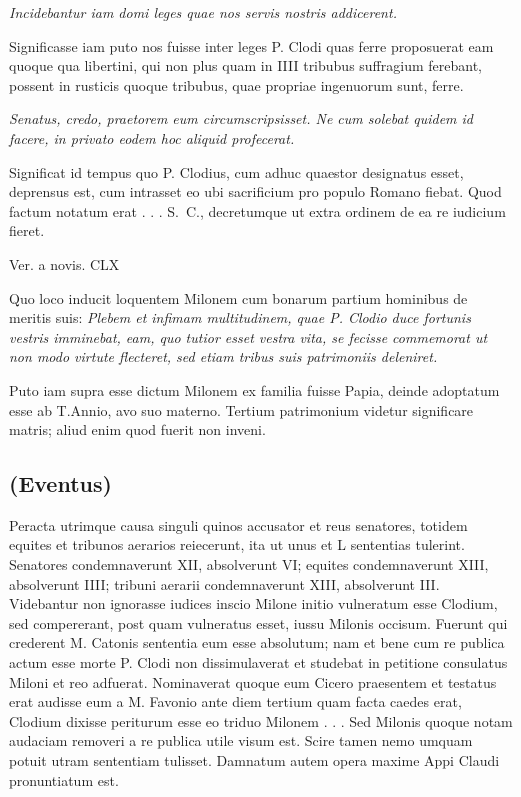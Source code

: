 \textit{Incidebantur iam domi leges quae nos servis nostris addicerent.}

Significasse iam puto nos fuisse inter leges P. Clodi quas ferre proposuerat eam quoque qua libertini, qui non plus quam in IIII tribubus suffragium ferebant, possent in rusticis quoque tribubus, quae propriae ingenuorum sunt, ferre.

\textit{Senatus, credo, praetorem eum circumscripsisset. Ne cum solebat quidem id facere, in privato eodem hoc aliquid profecerat.}

Significat id tempus quo P. Clodius, cum adhuc quaestor designatus esset, deprensus est, cum intrasset eo ubi sacrificium pro populo Romano fiebat. Quod factum notatum erat . . . S.~C., decretumque ut extra ordinem de ea re iudicium fieret.

Ver. a novis. CLX

Quo loco inducit loquentem Milonem cum bonarum partium hominibus de meritis suis: \textit{Plebem et infimam multitudinem, quae P. Clodio duce fortunis vestris imminebat, eam, quo tutior esset vestra vita, se fecisse commemorat ut non modo virtute flecteret, sed etiam tribus suis patrimoniis deleniret.}

Puto iam supra esse dictum Milonem ex familia fuisse Papia, deinde adoptatum esse ab T.Annio, avo suo materno. Tertium patrimonium videtur significare matris; aliud enim quod fuerit non inveni.

\subsection*{(Eventus)}

Peracta utrimque causa singuli quinos accusator et reus senatores, totidem equites et tribunos aerarios reiecerunt, ita ut unus et L sententias tulerint. Senatores condemnaverunt XII, absolverunt VI; equites condemnaverunt XIII, absolverunt IIII; tribuni aerarii condemnaverunt XIII, absolverunt III. Videbantur non ignorasse iudices inscio Milone initio vulneratum esse Clodium, sed compererant, post quam vulneratus esset, iussu Milonis occisum. Fuerunt qui crederent M. Catonis sententia eum esse absolutum; nam et bene cum re publica actum esse morte P. Clodi non dissimulaverat et studebat in petitione consulatus Miloni et reo adfuerat. Nominaverat quoque eum Cicero praesentem et testatus erat audisse eum a M. Favonio ante diem tertium quam facta caedes erat, Clodium dixisse periturum esse eo triduo Milonem . . . Sed Milonis quoque notam audaciam removeri a re publica utile visum est. Scire tamen nemo umquam potuit utram sententiam tulisset. Damnatum autem opera maxime Appi Claudi pronuntiatum est. 

